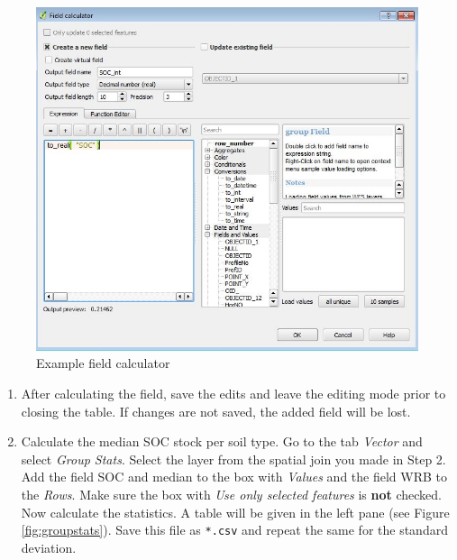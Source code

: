 \documentclass[10pt,b5paper,]{book}
\providecommand{\tightlist}{%
  \setlength{\itemsep}{0pt}\setlength{\parskip}{0pt}}
\theoremstyle{definition}
\theoremstyle{definition}
\theoremstyle{definition}
\theoremstyle{remark}
\begin{document}
\begin{figure}

{\centering \includegraphics[width=0.8\linewidth]{images/Conv_upscaling5} 

}

\caption{Example field calculator}\label{fig:fieldcalc}
\end{figure}

\begin{enumerate}
\def\labelenumi{\arabic{enumi}.}
\setcounter{enumi}{4}
\tightlist
\item
  After calculating the field, save the edits and leave the editing mode
  prior to closing the table. If changes are not saved, the added field
  will be lost.
\item
  Calculate the median SOC stock per soil type. Go to the tab
  \emph{Vector} and select \emph{Group Stats}. Select the layer from the
  spatial join you made in Step 2. Add the field SOC and median to the
  box with \emph{Values} and the field WRB to the \emph{Rows}. Make sure
  the box with \emph{Use only selected features} is \textbf{not}
  checked. Now calculate the statistics. A table will be given in the
  left pane (see Figure \ref{fig:groupstats}). Save this file as
  \texttt{*.csv} and repeat the same for the standard deviation.
\end{enumerate}
\end{document}
